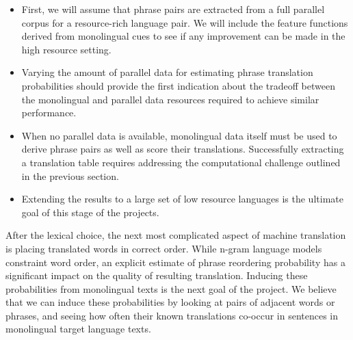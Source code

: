 \documentclass{article}
\begin{document}
\begin{itemize}
  \item First, we will assume that phrase pairs are extracted from a full parallel corpus for a resource-rich language pair.  We will include the feature functions derived from monolingual cues to see if any improvement can be made in the high resource setting.
  \item Varying the amount of parallel data for estimating phrase translation probabilities should provide the first indication about the tradeoff between the monolingual and parallel data resources required to achieve similar performance.  
  \item When no parallel data is available, monolingual data itself must be used to derive phrase pairs as well as score their translations.  Successfully extracting a translation table requires addressing the computational challenge outlined in the previous section.
  \item Extending the results to a large set of low resource languages is the ultimate goal of this stage of the projects.
\end{itemize}

After the lexical choice, the next most complicated aspect of machine translation is placing translated words in correct order.  While n-gram language models constraint word order, an explicit estimate of phrase reordering probability has a significant impact on the quality of resulting translation.  Inducing these probabilities from monolingual texts is the next goal of the project.  We believe that we can induce these probabilities by looking at pairs of adjacent words or phrases, and seeing how often their known translations co-occur in sentences in monolingual target language texts.  




 
\end{document}
